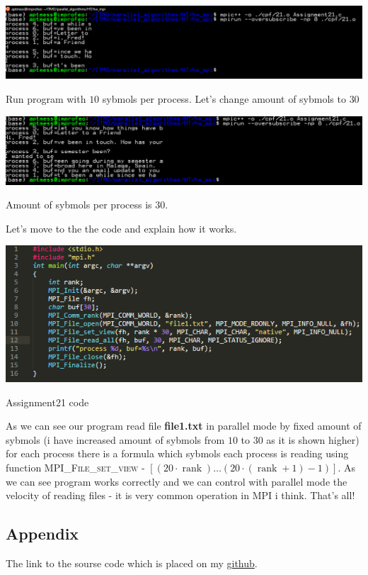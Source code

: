 \documentclass[%
12pt, %
final, %
oneside, %
onecolumn, %
centertags]{article} %
\theoremstyle{plain}
\theoremstyle{definition}
\theoremstyle{remark}
\begin{document}
\begin{center}
\includegraphics[scale=0.45]{21.run.png}

Run program with $10$ sybmols per process. Let's change amount of sybmols to $30$
\end{center}

\begin{center}
\includegraphics[scale=0.45]{21.run2.png}

Amount of sybmols per process is $30$.
\end{center}

Let's move to the the code and explain how it works.

\begin{center}
\includegraphics[scale=0.9]{21.code.png}

Assignment21 code
\end{center}

As we can see our program read file \textbf{file1.txt} in parallel mode by fixed amount of sybmols (i have increased amount of sybmols from $10$ to $30$ as it is shown higher) for each process there is a formula which sybmols each process is reading using function \textsc{MPI\_File\_set\_view} - $[\left(20\cdot\operatorname{rank}\right)\ldots \left( 20 \cdot (\operatorname{rank} + 1) - 1 \right)]$. As we can see program works correctly and we can control with parallel mode the velocity of reading files - it is very common operation in MPI i think. That's all!

\subsection{Appendix}


 
The link to the sourse code which is placed on my \href{https://github.com/aptmess/parallel_algorithms}{github}.
\end{document}
